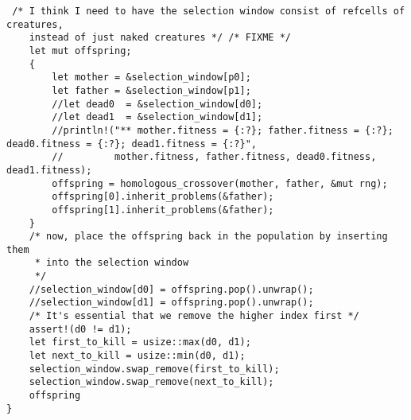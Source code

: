 \documentclass[11pt]{article}
\begin{document}
\begin{lstlisting}
 /* I think I need to have the selection window consist of refcells of creatures, 
    instead of just naked creatures */ /* FIXME */ 
    let mut offspring;
    {
        let mother = &selection_window[p0];
        let father = &selection_window[p1];
        //let dead0  = &selection_window[d0];
        //let dead1  = &selection_window[d1];
        //println!("** mother.fitness = {:?}; father.fitness = {:?}; dead0.fitness = {:?}; dead1.fitness = {:?}",
        //         mother.fitness, father.fitness, dead0.fitness, dead1.fitness);
        offspring = homologous_crossover(mother, father, &mut rng);
        offspring[0].inherit_problems(&father);
        offspring[1].inherit_problems(&father);
    }
    /* now, place the offspring back in the population by inserting them
     * into the selection window
     */
    //selection_window[d0] = offspring.pop().unwrap();
    //selection_window[d1] = offspring.pop().unwrap();
    /* It's essential that we remove the higher index first */
    assert!(d0 != d1);
    let first_to_kill = usize::max(d0, d1);
    let next_to_kill = usize::min(d0, d1);
    selection_window.swap_remove(first_to_kill);
    selection_window.swap_remove(next_to_kill);
    offspring
}
\end{lstlisting}
\end{document}

